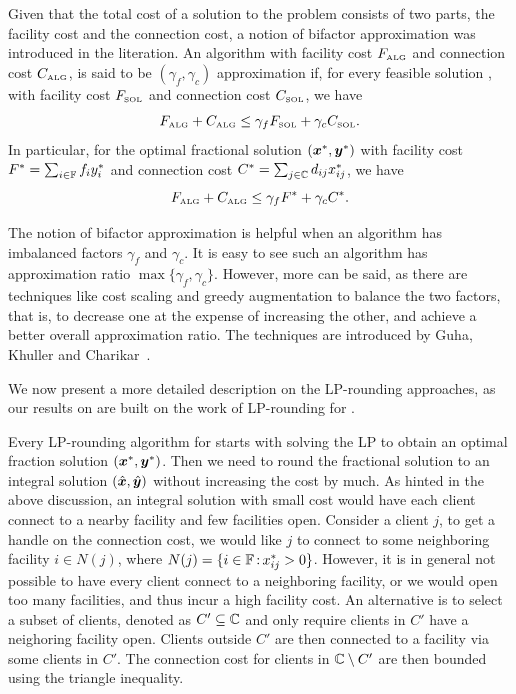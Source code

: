 \documentclass[oneside,final]{ucr}
\begin{document}
Given that the total cost of a solution to the {\UFL}
problem consists of two parts, the facility cost and the
connection cost, a notion of bifactor approximation was
introduced in the literation. An algorithm with facility
cost $F_{\mbox{\tiny\rm ALG}}$ and connection cost $C_{\mbox{\tiny\rm ALG}}$, is
said to be $(\gamma_f,\gamma_c)$ approximation if, for every
feasible solution {\SOL}, with facility cost $F_{{{\mbox{\tiny\rm SOL}}}}$ and
connection cost $C_{{{\mbox{\tiny\rm SOL}}}}$, we have
\begin{equation*}
  F_{\mbox{\tiny\rm ALG}} + C_{\mbox{\tiny\rm ALG}} \leq \gamma_f F_{{{\mbox{\tiny\rm SOL}}}} +
  \gamma_c C_{{{\mbox{\tiny\rm SOL}}}}.
\end{equation*}
In particular, for the optimal fractional solution
$(\boldsymbol{x}^\ast,\boldsymbol{y}^\ast)$ with facility cost $F^\ast =
\sum_{i\in\mathbb{F}} f_i y_i^\ast$ and connection cost
$C^\ast = \sum_{j\in\mathbb{C}} d_{ij} x_{ij}^\ast$, we have
\begin{equation*}
  F_{\mbox{\tiny\rm ALG}} + C_{\mbox{\tiny\rm ALG}} \leq \gamma_f F^\ast +
  \gamma_c C^\ast.
\end{equation*}

The notion of bifactor approximation is helpful when an
algorithm has imbalanced factors $\gamma_f$ and
$\gamma_c$. It is easy to see such an algorithm has
approximation ratio $\max\{\gamma_f, \gamma_c\}$. However,
more can be said, as there are techniques like cost scaling
and greedy augmentation to balance the two factors, that is,
to decrease one at the expense of increasing the other, and
achieve a better overall approximation ratio. The techniques
are introduced by Guha, Khuller and Charikar~\cite{GuhaK98,
  CharikarG05}.

We now present a more detailed description on the
LP-rounding approaches, as our results on {\FTFP} are built
on the work of LP-rounding for {\UFL}.

Every LP-rounding algorithm for {\UFL} starts with solving
the LP to obtain an optimal fraction solution
$(\boldsymbol{x}^\ast,\boldsymbol{y}^\ast)$. Then we need to round the
fractional solution to an integral solution
$(\hat{\boldsymbol{x}},\hat{\boldsymbol{y}})$ without increasing the cost by
much. As hinted in the above discussion, an integral
solution with small cost would have each client connect to a
nearby facility and few facilities open. Consider a client
$j$, to get a handle on the connection cost, we would like
$j$ to connect to some neighboring facility $i\in N(j)$,
where $N(j) = \{i\in\mathbb{F} {\,:\,} x_{ij}^\ast >
0\}$. However, it is in general not possible to have every
client connect to a neighboring facility, or we would open
too many facilities, and thus incur a high facility cost. An
alternative is to select a subset of clients, denoted as $C'
\subseteq \mathbb{C}$ and only require clients in $C'$ have
a neighoring facility open. Clients outside $C'$ are then
connected to a facility via some clients in $C'$. The
connection cost for clients in $\mathbb{C} \setminus C'$
are then bounded using the triangle inequality.
\end{document}
